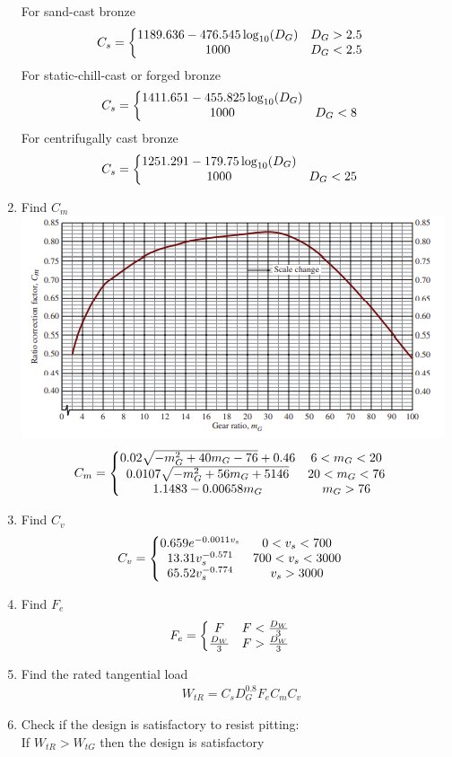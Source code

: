 \documentclass[11pt, fleqn]{article}
\begin{document}
\begin{enumerate}
    For sand-cast bronze
    \begin{align*}
        &C_s=\left\{\begin{matrix} 1189.636-476.545\log_{10}(D_G) & D_G>2.5\\ 1000 & D_G<2.5 \end{matrix}\right.
    \end{align*}
    For static-chill-cast or forged bronze
    \begin{align*}
        &C_s=\left\{\begin{matrix} 1411.651-455.825\log_{10}(D_G)\\ 1000 & D_G<8 \end{matrix}\right.
    \end{align*}
    For centrifugally cast bronze
    \begin{align*}
        &C_s=\left\{\begin{matrix} 1251.291-179.75\log_{10}(D_G)\\ 1000 & D_G<25 \end{matrix}\right.
    \end{align*}
    \item Find $C_m$\\
    \includegraphics[scale=1]{Gears/Fig 10-28.png}
    \begin{align*}
        &C_m=\left\{\begin{matrix} 0.02\sqrt{-m_G^2+40m_G-76}+0.46 & 6<m_G<20\\ 0.0107\sqrt{-m_G^2+56m_G+5146} & 20<m_G<76\\ 1.1483-0.00658m_G & m_G>76 \end{matrix}\right.
    \end{align*}
    \item Find $C_v$
    \begin{align*}
        &C_v=\left\{\begin{matrix} 0.659e^{-0.0011v_s} & 0<v_s<700\\ 13.31v_s^{-0.571} & 700<v_s<3000\\ 65.52v_s^{-0.774} & v_s>3000 \end{matrix}\right.
    \end{align*}
    \item Find $F_e$
    \begin{align*}
        &F_e=\left\{\begin{matrix} F & F<\frac{D_W}{3}\\ \frac{D_W}{3} & F>\frac{D_W}{3} \end{matrix}\right.
    \end{align*}
    \item Find the rated tangential load
    \begin{align*}
        &W_{tR}=C_sD_G^{0.8}F_eC_mC_v
    \end{align*}
    \item Check if the design is satisfactory to resist pitting:\\
    If $W_{tR}>W_{tG}$ then the design is satisfactory
\end{enumerate}
\end{document}
